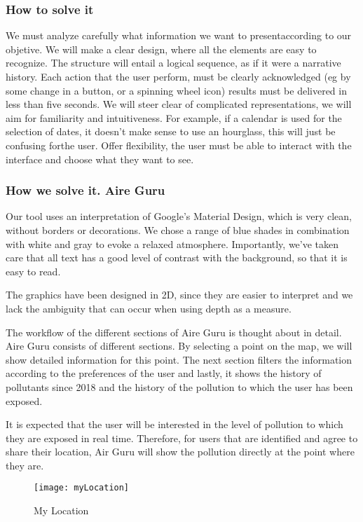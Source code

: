 \subsubsection*{How to solve it} 
We must analyze carefully what information we want to presentaccording to our objetive. We will make a clear design, where all the elements are easy to recognize.
The structure will entail a logical sequence, as if it were a narrative history.
Each action that the user perform, must be clearly acknowledged (eg by some change in a button, or a spinning wheel icon) results must be delivered in less than five seconds.
We will steer clear of complicated representations, we will aim for familiarity and intuitiveness.
For example, if a calendar is used for the selection of dates, it doesn't make sense to use an hourglass, this will just be confusing forthe user.
Offer flexibility, the user must be able to interact with the interface and choose what they want to see.

\subsubsection*{How we solve it. Aire Guru} 
Our tool uses an interpretation of Google's Material Design, which is very clean, without borders or decorations.
We chose a range of blue shades in combination with white and gray to evoke a relaxed atmosphere.
Importantly, we've taken care that all text has a good level of contrast with the background, so that it is easy to read.

The graphics have been designed in 2D, since they are easier to interpret and we lack the ambiguity that can occur when using depth as a measure.


The workflow of the different sections of Aire Guru is thought about in detail.
Aire Guru consists of different sections. By selecting a point on the map, we
will show detailed information for this point. The next section filters the information according to the preferences of the user
and lastly, it shows the history of pollutants since 2018 and the history of the pollution to which the user has been
exposed.

It is expected that the user will be interested in the level of pollution to which they are exposed in real time. Therefore, for users
that are identified and agree to share their location, Air Guru will show the pollution directly at the point where they are.


\begin{figure}[ht]
    \centering
    \texttt{[image: myLocation]}
    \caption{My Location}
\end{figure}

